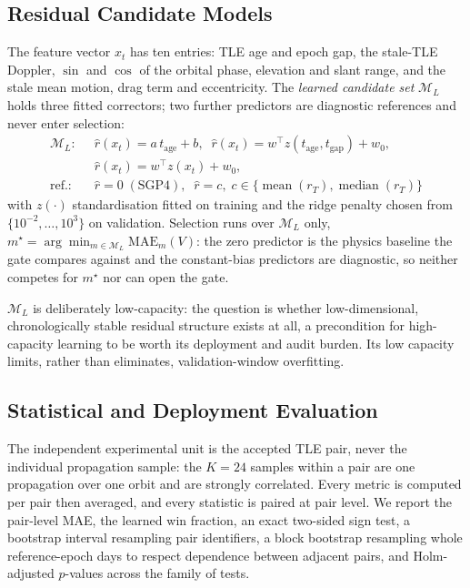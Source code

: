 \documentclass[conference]{IEEEtran}
\begin{document}
\subsection{Residual Candidate Models}
\label{sec:models}
The feature vector $x_t$ has ten entries: TLE age and epoch gap, the stale-TLE
Doppler, $\sin$ and $\cos$ of the orbital phase, elevation and slant range, and
the stale mean motion, drag term and eccentricity. The \emph{learned candidate
set} $\mathcal{M}_L$ holds three fitted correctors; two further predictors are
diagnostic references and never enter selection:
\begin{align}
\mathcal{M}_L:\;\; &\hat r(x_t) = a\,t_{\mathrm{age}} + b,\;\;
  \hat r(x_t) = w^{\!\top} z(t_{\mathrm{age}},t_{\mathrm{gap}}) + w_0,
  \label{eq:models}\\
 &\hat r(x_t) = w^{\!\top} z(x_t) + w_0, \nonumber\\
\text{ref.:}\;\; &\hat r = 0\;(\text{SGP4}),\;\;
  \hat r = c,\; c\in\{\operatorname{mean}(r_T),\operatorname{median}(r_T)\}
  \nonumber
\end{align}
with $z(\cdot)$ standardisation fitted on training and the ridge penalty chosen
from $\{10^{-2},\dots,10^{3}\}$ on validation. Selection runs over $\mathcal{M}_L$
only, $m^{\star}=\arg\min_{m\in\mathcal{M}_L}\mathrm{MAE}_m(V)$: the zero
predictor is the physics baseline the gate compares against and the
constant-bias predictors are diagnostic, so neither competes for $m^{\star}$ nor
can open the gate.

$\mathcal{M}_L$ is deliberately low-capacity: the question is whether
low-dimensional, chronologically stable residual structure exists at all, a
precondition for high-capacity learning to be worth its deployment and audit
burden. Its low capacity limits, rather than eliminates,
validation-window overfitting.

\subsection{Statistical and Deployment Evaluation}
\label{sec:stats}
The independent experimental unit is the accepted TLE pair, never the individual
propagation sample: the $K=24$ samples within a pair are one propagation over one
orbit and are strongly correlated. Every metric is computed per pair then
averaged, and every statistic is paired at pair level. We report the pair-level MAE, the learned win fraction, an exact two-sided sign
test, a bootstrap interval resampling pair identifiers, a block bootstrap
resampling whole reference-epoch days to respect dependence between adjacent
pairs, and Holm-adjusted $p$-values across the family of tests.
\end{document}
